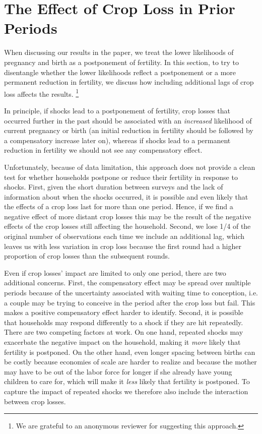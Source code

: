 \documentclass[letterpaper,12pt]{article}
\begin{document}
\section{The Effect of Crop Loss in Prior Periods}

When discussing our results in the paper, we treat the 
lower likelihoods of pregnancy and birth as a postponement 
of fertility.
In this section, to try to disentangle whether the lower 
likelihoods reflect a postponement or a more permanent reduction 
in fertility, we discuss how including additional lags
of crop loss affects the results.%
\footnote{
We are grateful to an anonymous reviewer for suggesting 
this approach.
}

In principle, if shocks lead to a postponement of fertility,
crop losses that occurred further in the past should be
associated with an \emph{increased} likelihood of current pregnancy 
or birth (an initial reduction in fertility should be followed
by a compensatory increase later on), 
whereas if shocks lead to a permanent reduction in fertility we
should not see any compensatory effect.

Unfortunately, because of data limitation, this approach does not 
provide a clean test for whether households 
postpone or reduce their fertility in response to shocks.
First, given the short duration between surveys and the lack of 
information about when the shocks occurred, it is possible and
even likely that the effects of a crop loss last for more than one period.
Hence, if we find a negative effect of more distant crop losses
this may be the result of the negative effects of the crop losses
still affecting the household.
Second, we lose 1/4 of the original number of observations each 
time we include an additional lag, which leaves us with less variation 
in crop loss because the first round had a higher proportion of crop 
losses than the subsequent rounds.

Even if crop losses' impact are limited to only one period, there 
are two additional concerns.
First, the compensatory effect may be spread over multiple 
periods because of the uncertainty associated with waiting time
to conception, i.e. a couple may be trying to conceive in the
period after the crop loss but fail.
This makes a positive compensatory effect harder to 
identify.
Second, it is possible that households may respond differently to a 
shock if they are hit repeatedly.
There are two competing factors at work.
On one hand, repeated shocks may exacerbate the negative impact on the
household, making it \emph{more} likely that fertility is postponed.
On the other hand, even longer spacing between births can be costly 
because economies of scale are harder to realize and because the 
mother may have to  be out of the labor force for longer if she 
already have young children to care for, which will make it
\emph{less} likely that fertility is postponed.
To capture the impact of repeated shocks we therefore also 
include the interaction between crop losses.
\end{document}

